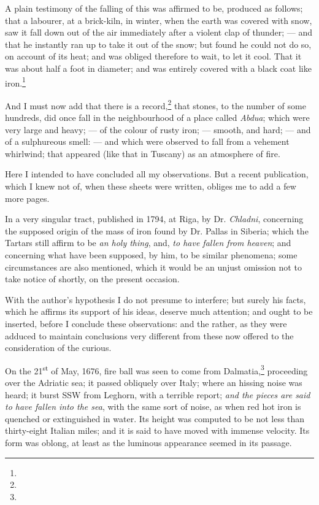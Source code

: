 \documentclass[a4paper, 12pt, oneside]{article}
\begin{document}
A plain testimony of the falling of this was affirmed to be, produced as follows; that a labourer, at a brick-kiln, in winter, when the earth was covered with snow, saw it fall down out of the air immediately after a violent clap of thunder; --- and that he instantly ran up to take it out of the snow; but found he could not do so, on account of its heat; and was obliged therefore to wait, to let it cool. That it was about half a foot in diameter; and was entirely covered with a black coat like iron.\footnote{}

And I must now add that there is a record,\footnote{} that stones, to the number of some hundreds, did once fall in the neighbourhood of a place called \emph{Abdua}; which were very large and heavy; --- of the colour of rusty iron; --- smooth, and hard; --- and of a sulphureous smell: --- and which were observed to fall from a vehement whirlwind; that appeared (like that in Tuscany) as an atmosphere of fire.

Here I intended to have concluded all my observations. But a recent publication, which I knew not of, when these sheets were written, obliges me to add a few more pages.

In a very singular tract, published in 1794, at Riga, by Dr. \emph{Chladni}, concerning the supposed origin of the mass of iron found by Dr. Pallas in Siberia; which the Tartars still affirm to be \emph{an holy thing}, and, \emph{to have fallen from heaven}; and concerning what have been supposed, by him, to be similar phenomena; some circumstances are also mentioned, which it would be an unjust omission not to take notice of shortly, on the present occasion.

With the author's hypothesis I do not presume to interfere; but surely his facts, which he affirms its support of his ideas, deserve much attention; and ought to be inserted, before I conclude these observations: and the rather, as they were adduced to maintain conclusions very different from these now offered to the consideration of the curious.

On the 21\textsuperscript{st} of May, 1676, fire ball was seen to come from Dalmatia,\footnote{} proceeding over the Adriatic sea; it passed obliquely over Italy; where an hissing noise was heard; it burst SSW from Leghorn, with a terrible report; \emph{and the pieces are said to have fallen into the sea}, with the same sort of noise, as when red hot iron is quenched or extinguished in water. Its height was computed to be not less than thirty-eight Italian miles; and it is said to have moved with immense velocity. Its form was oblong, at least as the luminous appearance seemed in its passage.
\end{document}
